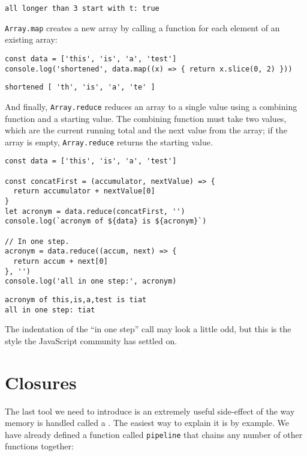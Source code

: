 \begin{verbatim}
all longer than 3 start with t: true
\end{verbatim}

\texttt{Array.map} creates a new array by calling a function for each element of an existing array:

\begin{verbatim}
const data = ['this', 'is', 'a', 'test']
console.log('shortened', data.map((x) => { return x.slice(0, 2) }))
\end{verbatim}

\begin{verbatim}
shortened [ 'th', 'is', 'a', 'te' ]
\end{verbatim}

And finally,
\texttt{Array.reduce} reduces an array to a single value
using a combining function and a starting value.
The combining function must take two values,
which are the current running total and the next value from the array;
if the array is empty,
\texttt{Array.reduce} returns the starting value.

\begin{verbatim}
const data = ['this', 'is', 'a', 'test']

const concatFirst = (accumulator, nextValue) => {
  return accumulator + nextValue[0]
}
let acronym = data.reduce(concatFirst, '')
console.log(`acronym of ${data} is ${acronym}`)

// In one step.
acronym = data.reduce((accum, next) => {
  return accum + next[0]
}, '')
console.log('all in one step:', acronym)
\end{verbatim}

\begin{verbatim}
acronym of this,is,a,test is tiat
all in one step: tiat
\end{verbatim}

The indentation of the ``in one step'' call may look a little odd,
but this is the style the JavaScript community has settled on.

\section{Closures}\label{s:callbacks-closures}

The last tool we need to introduce is an extremely useful side-effect of the way memory is handled
called a .
The easiest way to explain it is by example.
We have already defined a function called \texttt{pipeline} that chains any number of other functions together:


